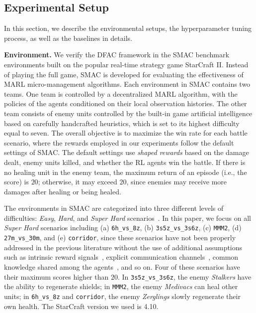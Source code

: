 \documentclass[twoside,11pt]{article}
\begin{document}
 


\subsection{Experimental Setup}
\label{subsec:experiment_results_setup_of_smac}

In this section, we describe the environmental setups, the hyperparameter tuning process, as well as the baselines in details.

\textbf{Environment.}
We verify the DFAC framework in the SMAC benchmark environments \citep{Samvelyan2019SMAC} built on the popular real-time strategy game StarCraft II. Instead of playing the full game, SMAC is developed for evaluating the effectiveness of MARL micro-management algorithms. Each environment in SMAC contains two teams. One team is controlled by a decentralized MARL algorithm, with the policies of the agents conditioned on their local observation histories. The other team consists of enemy units controlled by the built-in game artificial intelligence based on carefully handcrafted heuristics, which is set to its highest difficulty equal to seven. The overall objective is to maximize the win rate for each battle scenario, where the rewards employed in our experiments follow the default settings of SMAC. The default settings use \textit{shaped rewards} based on the damage dealt, enemy units killed, and whether the RL agents win the battle. If there is no healing unit in the enemy team, the maximum return of an episode (i.e., the score) is $20$; otherwise, it may exceed $20$, since enemies may receive more damages after healing or being healed.

The environments in SMAC are categorized into three different levels of difficulties: \textit{Easy}, \textit{Hard}, and \textit{Super Hard} scenarios~\citep{Samvelyan2019SMAC}. In this paper, we focus on all \textit{Super Hard} scenarios including (a) \texttt{6h\_vs\_8z},  (b) \texttt{3s5z\_vs\_3s6z}, (c) \texttt{MMM2}, (d) \texttt{27m\_vs\_30m}, and (e) \texttt{corridor}, since these scenarios have not been properly addressed in the previous literature without the use of additional assumptions such as intrinsic reward signals~\citep{Du2019LIIR}, explicit communication channels~\citep{Zhang2019VBN,Wang2019NDQ}, common knowledge shared among the agents~\citep{De2019MACKRL,Wang2020ROMA}, and so on. Four of these scenarios have their maximum scores higher than $20$. In \texttt{3s5z\_vs\_3s6z}, the enemy \textit{Stalkers} have the ability to regenerate shields; in \texttt{MMM2}, the enemy \textit{Medivacs} can heal other units; in \texttt{6h\_vs\_8z} and \texttt{corridor}, the enemy \textit{Zerglings} slowly regenerate their own health. The StarCraft version we used is 4.10.
\end{document}
